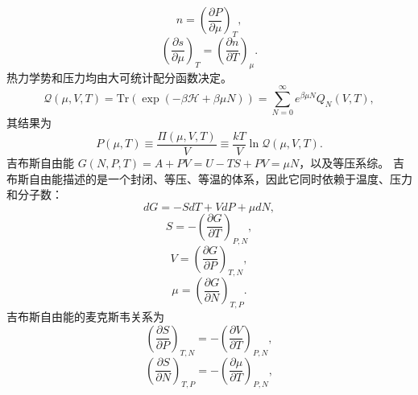 \begin{equation}\tag{17.11.10}\label{eq:17.11.10}
n = \left( { \frac { \partial P } { \partial \mu } } \right) _ { T } ,
\end{equation}
\begin{equation}\tag{17.11.11}\label{eq:17.11.11}
\left( { \frac { \partial s } { \partial \mu } } \right) _ { T } = \left( { \frac { \partial n } { \partial T } } \right) _ { \mu } .
\end{equation}
热力学势和压力均由大可统计配分函数决定。
\begin{equation}\tag{17.11.12}\label{eq:17.11.12}
\mathcal { Q } ( \mu , V , T ) = \mathrm { T r } \left( \exp ( - \beta \mathcal { H } + \beta \mu N ) \right) = \sum _ { N = 0 } ^{\infty} e ^{\beta \mu N} Q _ { N } ( V , T ) ,
\end{equation}
其结果为
\begin{equation}\tag{17.11.13}\label{eq:17.11.13}
P ( \mu , T ) \equiv \frac { \Pi ( \mu , V , T ) } { V } \equiv \frac { k T } { V } \ln \mathcal { Q } ( \mu , V , T ) .
\end{equation}
吉布斯自由能 \(G(N,P,T)=A+PV=U-TS+PV=\mu N\)，以及等压系综。
吉布斯自由能描述的是一个封闭、等压、等温的体系，因此它同时依赖于温度、压力和分子数：
\begin{equation}\tag{17.11.14}\label{eq:17.11.14}
d G = - S d T + V d P + \mu d N ,
\end{equation}
\begin{equation}\tag{17.11.15}\label{eq:17.11.15}
S = - \left( \frac { \partial G } { \partial T } \right) _ { P , N } ,
\end{equation}
\begin{equation}\tag{17.11.16}\label{eq:17.11.16}
V = \left( \frac { \partial G } { \partial P } \right) _ { T , N } ,
\end{equation}
\begin{equation}\tag{17.11.17}\label{eq:17.11.17}
\mu = \left( \frac { \partial G } { \partial N } \right) _ { T , P } .
\end{equation}
吉布斯自由能的麦克斯韦关系为
\begin{equation}\tag{17.11.18}\label{eq:17.11.18}
\left( \frac { \partial S } { \partial P } \right) _ { T , N } = - \left( \frac { \partial V } { \partial T } \right) _ { P , N } ,
\end{equation}
\begin{equation}\tag{17.11.19}\label{eq:17.11.19}
\left( \frac { \partial S } { \partial N } \right) _ { T , P } = - \left( \frac { \partial \mu } { \partial T } \right) _ { P , N } ,
\end{equation}
